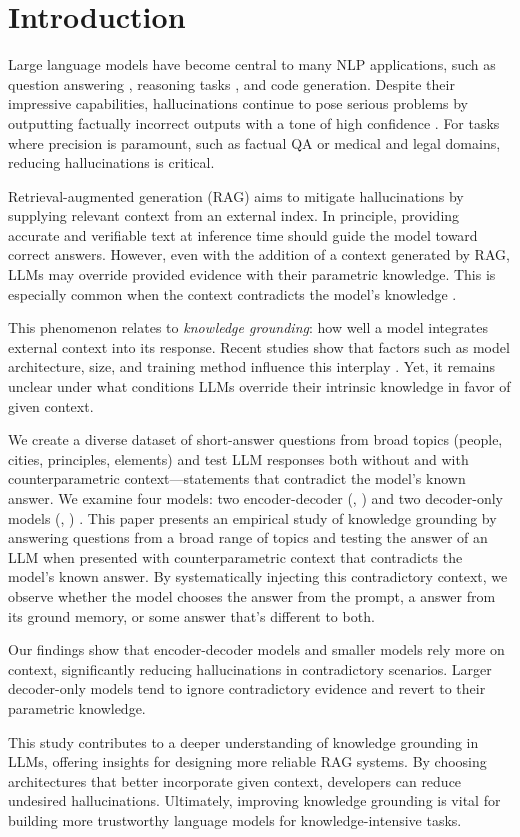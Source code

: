 \section{Introduction}

Large language models have become central to many NLP applications, such as question answering \cite{gpt3,how_can_we_know}, reasoning tasks \cite{treeofthoughts}, and code generation.
Despite their impressive capabilities, hallucinations continue to pose serious problems by outputting factually incorrect outputs with a tone of high confidence \cite{how_can_we_know}.
For tasks where precision is paramount, such as factual QA or medical and legal domains, reducing hallucinations is critical.

Retrieval-augmented generation (RAG) \cite{rag} aims to mitigate hallucinations by supplying relevant context from an external index.
In principle, providing accurate and verifiable text at inference time should guide the model toward correct answers.
However, even with the addition of a context generated by RAG, LLMs may override provided evidence with their parametric knowledge.
This is especially common when the context contradicts the model's knowledge \cite{factual_recall,ragged}.

This phenomenon relates to \emph{knowledge grounding}: how well a model integrates external context into its response.
Recent studies show that factors such as model architecture, size, and training method influence this interplay \cite{factual_recall,flant5,llama}.
Yet, it remains unclear under what conditions LLMs override their intrinsic knowledge in favor of given context.

We create a diverse dataset of short-answer questions from broad topics (people, cities, principles, elements) and test LLM responses both without and with counterparametric context—statements that contradict the model's known answer.
We examine four models: two encoder-decoder (\smallflan{}, \bigflan{}) \cite{t5,flant5} and two decoder-only models (\smallllama{}, \bigllama{}) \cite{llama3}.
This paper presents an empirical study of knowledge grounding by answering questions from a broad range of topics and testing the answer of an LLM when presented with counterparametric context that contradicts the model's known answer.
By systematically injecting this contradictory context, we observe whether the model chooses the \Contextual{} answer from the prompt, a \Parametric{} answer from its ground memory, or some \Other{} answer that's different to both.

Our findings show that encoder-decoder models and smaller models rely more on context, significantly reducing hallucinations in contradictory scenarios.
Larger decoder-only models tend to ignore contradictory evidence and revert to their parametric knowledge.

This study contributes to a deeper understanding of knowledge grounding in LLMs, offering insights for designing more reliable RAG systems.
By choosing architectures that better incorporate given context, developers can reduce undesired hallucinations.
Ultimately, improving knowledge grounding is vital for building more trustworthy language models for knowledge-intensive tasks.
